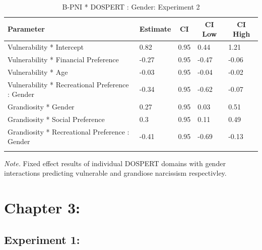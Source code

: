 \documentclass[
  donotrepeattitle,doc, 12pt, a4paper,floatsintext]{apa7}
\begin{document}
\begin{table}[h]

\begin{center}
\begin{threeparttable}

\caption{\label{tab:Vulnerability and Grandiosity_DOSPERT}B-PNI * DOSPERT : Gender: Experiment 2}

\begin{tabular}{lllll}
\toprule
Parameter & \multicolumn{1}{c}{Estimate} & \multicolumn{1}{c}{CI} & \multicolumn{1}{c}{CI Low} & \multicolumn{1}{c}{CI High}\\
\midrule
Vulnerability * Intercept & 0.82 & 0.95 & 0.44 & 1.21\\
Vulnerability * Financial Preference & -0.27 & 0.95 & -0.47 & -0.06\\
Vulnerability * Age & -0.03 & 0.95 & -0.04 & -0.02\\
Vulnerability * Recreational Preference : Gender & -0.34 & 0.95 & -0.62 & -0.07\\
Grandiosity * Gender & 0.27 & 0.95 & 0.03 & 0.51\\
Grandiosity * Social Preference & 0.3 & 0.95 & 0.11 & 0.49\\
Grandiosity * Recreational Preference : Gender & -0.41 & 0.95 & -0.69 & -0.13\\
\bottomrule
\addlinespace
\end{tabular}

\begin{tablenotes}[para]
\normalsize{\textit{Note.} Fixed effect results of individual DOSPERT domains with gender interactions predicting vulnerable and grandiose narcissism respectivley.}
\end{tablenotes}

\end{threeparttable}
\end{center}

\end{table}

\hypertarget{chapter-3}{%
\section{Chapter 3:}\label{chapter-3}}

\hypertarget{experiment-1-1}{%
\subsection{Experiment 1:}\label{experiment-1-1}}
\end{document}
